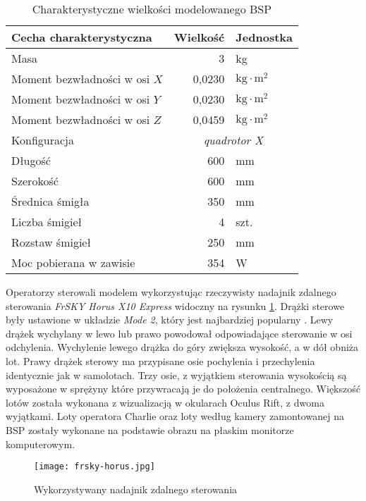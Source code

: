 \begin{table}[!h] \centering
    \caption{Charakterystyczne wielkości modelowanego BSP}
    \label{tab:sitl-model}

    \begin{tabular}{|l | r|l |}
    \hline
    Cecha charakterystyczna & Wielkość & Jednostka \\ \hline \hline
    Masa & 3 & kg \\ \hline
    Moment bezwładności w osi $ X $ & 0,0230 & $ \text{kg}\cdot\text{m}^2 $ \\ \hline
    Moment bezwładności w osi $ Y $ & 0,0230 & $ \text{kg}\cdot\text{m}^2 $ \\ \hline
    Moment bezwładności w osi $ Z $ & 0,0459 & $ \text{kg}\cdot\text{m}^2 $ \\ \hline
    Konfiguracja & \multicolumn{2}{c|}{\emph{quadrotor X}} \\ \hline
    Długość & 600 & mm \\ \hline
    Szerokość & 600 & mm \\ \hline
    Średnica śmigła & 350 & mm \\ \hline
    Liczba śmigieł & 4 & szt. \\ \hline
    Rozstaw śmigieł & 250 & mm \\ \hline
    Moc pobierana w zawisie & 354 & W \\ \hline
  \end{tabular}
\end{table}

Operatorzy sterowali modelem wykorzystując rzeczywisty nadajnik zdalnego sterowania \emph{FrSKY Horus X10 Express} widoczny na rysunku \ref{fig:frsky-horus}. Drążki sterowe były ustawione w układzie \emph{Mode 2}, który jest najbardziej popularny \cite{mcnabb2021}. Lewy drążek wychylany w lewo lub prawo powodował odpowiadające sterowanie w osi odchylenia. Wychylenie lewego drążka do góry zwiększa wysokość, a w dół obniża lot. Prawy drążek sterowy ma przypisane osie pochylenia i przechylenia identycznie jak w samolotach. Trzy osie, z wyjątkiem sterowania wysokością są wyposażone w sprężyny które przywracają je do położenia centralnego. Większość lotów została wykonana z wizualizacją w okularach Oculus Rift, z dwoma wyjątkami. Loty operatora Charlie oraz loty według kamery zamontowanej na BSP zostały wykonane na podstawie obrazu na płaskim monitorze komputerowym.

\begin{figure}[!h]
    \centering \texttt{[image: frsky-horus.jpg]}
    \caption{Wykorzystywany nadajnik zdalnego sterowania}
    \label{fig:frsky-horus}
\end{figure}


